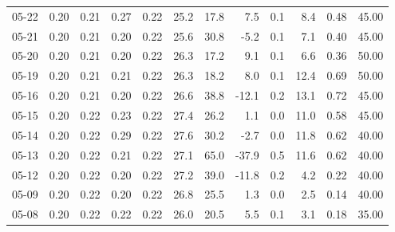 \begin{threeparttable}
{\begin{tabular}{lrrrrrrrrrrr}
  05-22 &          0.20 &          0.21 &          0.27 &        0.22 &                25.2 &                17.8 &        7.5 &                 0.1 &              8.4 &            0.48 &                  45.00 \\
  05-21 &          0.20 &          0.21 &          0.20 &        0.22 &                25.6 &                30.8 &       -5.2 &                 0.1 &              7.1 &            0.40 &                  45.00 \\
  05-20 &          0.20 &          0.21 &          0.20 &        0.22 &                26.3 &                17.2 &        9.1 &                 0.1 &              6.6 &            0.36 &                  50.00 \\
  05-19 &          0.20 &          0.21 &          0.21 &        0.22 &                26.3 &                18.2 &        8.0 &                 0.1 &             12.4 &            0.69 &                  50.00 \\
  05-16 &          0.20 &          0.21 &          0.20 &        0.22 &                26.6 &                38.8 &      -12.1 &                 0.2 &             13.1 &            0.72 &                  45.00 \\
  05-15 &          0.20 &          0.22 &          0.23 &        0.22 &                27.4 &                26.2 &        1.1 &                 0.0 &             11.0 &            0.58 &                  45.00 \\
  05-14 &          0.20 &          0.22 &          0.29 &        0.22 &                27.6 &                30.2 &       -2.7 &                 0.0 &             11.8 &            0.62 &                  40.00 \\
  05-13 &          0.20 &          0.22 &          0.21 &        0.22 &                27.1 &                65.0 &      -37.9 &                 0.5 &             11.6 &            0.62 &                  40.00 \\
  05-12 &          0.20 &          0.22 &          0.20 &        0.22 &                27.2 &                39.0 &      -11.8 &                 0.2 &              4.2 &            0.22 &                  40.00 \\
  05-09 &          0.20 &          0.22 &          0.20 &        0.22 &                26.8 &                25.5 &        1.3 &                 0.0 &              2.5 &            0.14 &                  40.00 \\
  05-08 &          0.20 &          0.22 &          0.22 &        0.22 &                26.0 &                20.5 &        5.5 &                 0.1 &              3.1 &            0.18 &                  35.00 \\

\end{tabular}}
\end{threeparttable}
